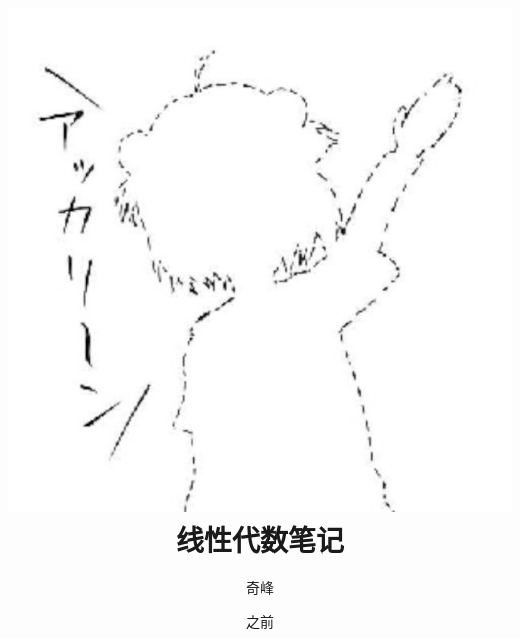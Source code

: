 \documentclass[oneside]{ctexbook}
\title{\includegraphics[scale=0.6]{1.jpg}\\ \textsf{线性代数笔记}}
\author{奇峰}
\date{之前}
\begin{document}
\theoremseparator{}
\newtheorem{def1}{定义}[section]
\newtheorem{theo1}{定理}[section]
\newtheorem{func1}{方法}[section]
\newtheorem{infer1}{推论}[section]
\newenvironment{proof}[1][证明]{\noindent\newline\textbf{#1}\quad{}}{\hfill $\blacksquare$\par}



\newenvironment{Def}[1][\quad{}]{\begin{def1}\textbf{#1}}{\end{def1}}
\newenvironment{Theo}[1][\quad{}]{\begin{theo1}\textbf{#1}}{\end{theo1}}
\newenvironment{Func}[1][\quad{}]{\begin{func1}\textbf{#1}}{\end{func1}}
\newenvironment{Infer}[1][\quad{}]{\begin{infer1}\textbf{#1}}{\end{infer1}}
\newenvironment{Field}[1][\quad{}]{\noindent\newline\textbf{#1}}{}

\setlength{\parskip}{3pt}

\renewcommand{\labelitemii}{$ \circ $ }

\frontmatter
\maketitle
\hypertarget{Index}{}
\tableofcontents

\mainmatter







\end{document}
